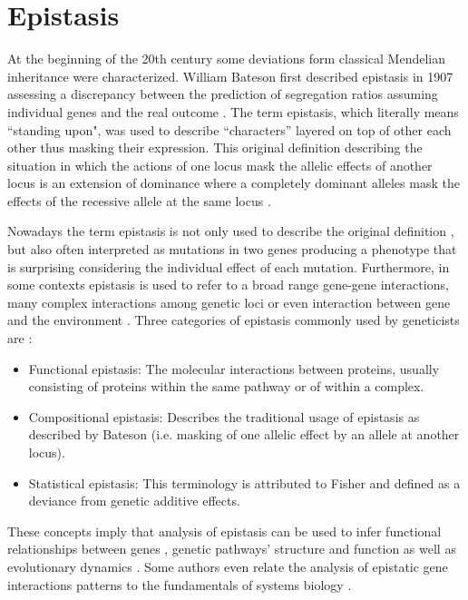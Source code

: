 \section{Epistasis \label{sec:epi}}

At the beginning of the 20th century some deviations form classical Mendelian inheritance were characterized.
William Bateson first described epistasis in 1907 \cite{tyler2009shadows} assessing a discrepancy between the prediction of segregation ratios assuming individual genes and the real outcome \cite{phillips2008epistasis}.
The term epistasis, which literally means ``standing upon", was used to describe ``characters'' layered on top of other each other thus masking their expression.
This original definition describing the situation in which the actions of one locus mask the allelic effects of another locus is an extension of dominance where a completely dominant alleles mask the effects of the recessive allele at the same locus \cite{carlborg2004epistasis, cordell2002epistasis}.

Nowadays the term epistasis is not only used to describe the original definition \cite{cordell2002epistasis}, but also often interpreted as mutations in two genes producing a phenotype that is surprising considering the individual effect of each mutation.
Furthermore, in some contexts epistasis is used to refer to a broad range gene-gene interactions, many complex interactions among genetic loci or even interaction between gene and the environment \cite{phillips2008epistasis}.
Three categories of epistasis commonly used by geneticists are \cite{phillips2008epistasis, zhao2006test}: 

\begin{itemize}
	\item Functional epistasis: The molecular interactions between proteins, usually consisting of proteins within the same pathway or of within a complex.
	\item Compositional epistasis: Describes the traditional usage of epistasis as described by Bateson (i.e. masking of one allelic effect by an allele at another locus).
	\item Statistical epistasis: This terminology is attributed to Fisher and defined as a deviance from genetic additive effects.
\end{itemize}

These concepts imply that analysis of epistasis can be used to infer functional relationships between genes \cite{mani2008defining}, genetic pathways' structure and function as well as evolutionary dynamics \cite{phillips2008epistasis}. 
Some authors even relate the analysis of epistatic gene interactions patterns to the fundamentals of systems biology \cite{phillips2008epistasis}.

